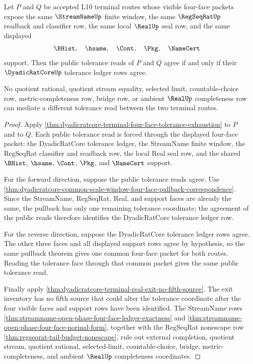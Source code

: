 \begin{theorem}
\label{thm:dyadicratcore-terminal-four-face-tolerance-projection}
Let $P$ and $Q$ be accepted L10 terminal routes whose visible four-face packets expose the same $\StreamNameUp$ finite window, the same $\RegSeqRatUp$ readback and classifier row, the same local $\RealUp$ seal row, and the same displayed
$$
\BHist,\quad \hsame,\quad \Cont,\quad \Pkg,\quad \NameCert
$$
support. Then the public tolerance reads of $P$ and $Q$ agree if and only if their $\DyadicRatCoreUp$ tolerance ledger rows agree.

No quotient rational, quotient stream equality, selected limit, countable-choice row, metric-completeness row, bridge row, or ambient $\RealUp$ completeness row can mediate a different tolerance read between the two terminal routes.
\end{theorem}
\begin{proof}
Apply \autoref{thm:dyadicratcore-terminal-four-face-tolerance-exhaustion} to $P$ and to $Q$. Each public tolerance read is forced through the displayed four-face packet: the DyadicRatCore tolerance ledger, the StreamName finite window, the RegSeqRat classifier and readback row, the local Real seal row, and the shared $\BHist$, $\hsame$, $\Cont$, $\Pkg$, and $\NameCert$ support.

For the forward direction, suppose the public tolerance reads agree. Use \autoref{thm:dyadicratcore-common-scale-window-four-face-pullback-correspondence}. Since the StreamName, RegSeqRat, Real, and support faces are already the same, the pullback has only one remaining tolerance coordinate; the agreement of the public reads therefore identifies the DyadicRatCore tolerance ledger row.

For the reverse direction, suppose the DyadicRatCore tolerance ledger rows agree. The other three faces and all displayed support rows agree by hypothesis, so the same pullback theorem gives one common four-face packet for both routes. Reading the tolerance face through that common packet gives the same public tolerance read.

Finally apply \autoref{thm:dyadicratcore-terminal-real-exit-no-fifth-source}. The exit inventory has no fifth source that could alter the tolerance coordinate after the four visible faces and support rows have been identified. The StreamName rows \autoref{thm:streamname-open-phase-four-face-ledger-exactness} and \autoref{thm:streamname-open-phase-four-face-normal-form}, together with the RegSeqRat nonescape row \autoref{thm:regseqrat-tail-budget-nonescape}, rule out external completion, quotient stream, quotient rational, selected-limit, countable-choice, bridge, metric-completeness, and ambient $\RealUp$ completeness coordinates.
\end{proof}

